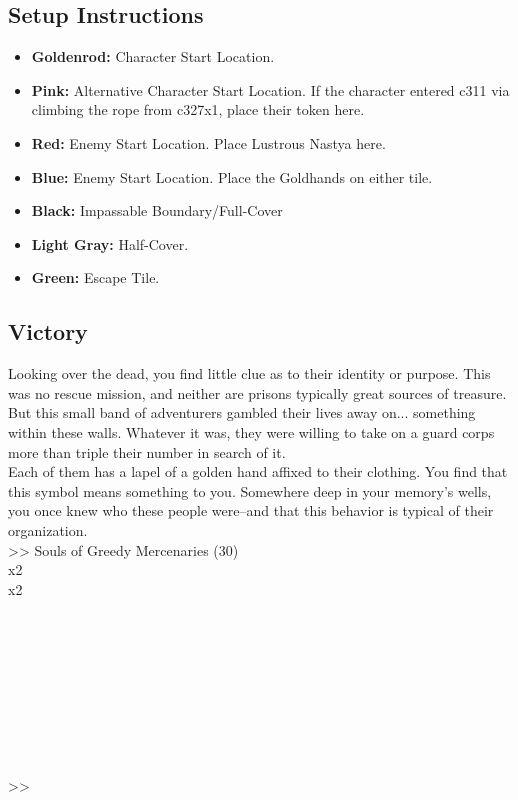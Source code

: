 \subsection*{Setup Instructions}
\begin{itemize}
\item \textbf{Goldenrod:} Character Start Location.
\item \textbf{Pink:} Alternative Character Start Location. If the character entered c311 via climbing the rope from c327x1, place their token here.
\item \textbf{Red:} Enemy Start Location. Place Lustrous Nastya here.
\item \textbf{Blue:} Enemy Start Location. Place the Goldhands on either tile.
\item \textbf{Black:} Impassable Boundary/Full-Cover
\item \textbf{Light Gray:} Half-Cover.
\item \textbf{Green:} Escape Tile.
\end{itemize}

\pagebreak

\subsection*{Victory}
Looking over the dead, you find little clue as to their identity or purpose. This was no rescue mission, and neither are prisons typically great sources of treasure. But this small band of adventurers gambled their lives away on... something within these walls. Whatever it was, they were willing to take on a guard corps more than triple their number in search of it.\\

Each of them has a lapel of a golden hand affixed to their clothing. You find that this symbol means something to you. Somewhere deep in your memory’s wells, you once knew who these people were--and that this behavior is typical of their organization.\\

>> Souls of Greedy Mercenaries (30)\\
 x2\\
 x2\\
\\
\\
\\
\\
\\
\\
\\
\\
\\
>> 

